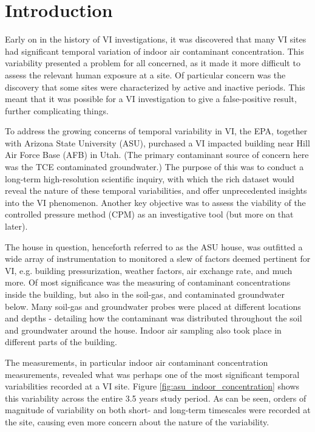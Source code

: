 \section{Introduction}\label{chp4:intro}

Early on in the history of VI investigations, it was discovered that many VI sites had significant temporal variation of indoor air contaminant concentration.
This variability presented a problem for all concerned, as it made it more difficult to assess the relevant human exposure at a site.
Of particular concern was the discovery that some sites were characterized by active and inactive periods.
This meant that it was possible for a VI investigation to give a false-positive result, further complicating things.\par

To address the growing concerns of temporal variability in VI, the EPA, together with Arizona State University (ASU), purchased a VI impacted building near Hill Air Force Base (AFB) in Utah.
(The primary contaminant source of concern here was the TCE contaminated groundwater.)
The purpose of this was to conduct a long-term high-resolution scientific inquiry, with which the rich dataset would reveal the nature of these temporal variabilities, and offer unprecedented insights into the VI phenomenon.
Another key objective was to assess the viability of the controlled pressure method (CPM) as an investigative tool (but more on that later).\par

The house in question, henceforth referred to as the ASU house, was outfitted a wide array of instrumentation to monitored a slew of factors deemed pertinent for VI, e.g. building pressurization, weather factors, air exchange rate, and much more.
Of most significance was the measuring of contaminant concentrations inside the building, but also in the soil-gas, and contaminated groundwater below.
Many soil-gas and groundwater probes were placed at different locations and depths - detailing how the contaminant was distributed throughout the soil and groundwater around the house.
Indoor air sampling also took place in different parts of the building.\par

The measurements, in particular indoor air contaminant concentration measurements, revealed what was perhaps one of the most significant temporal variabilities recorded at a VI site.
Figure \ref{fig:asu_indoor_concentration} shows this variability across the entire 3.5 years study period.
As can be seen, orders of magnitude of variability on both short- and long-term timescales were recorded at the site, causing even more concern about the nature of the variability.\par

